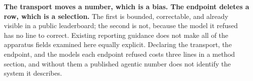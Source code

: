 \textbf{The transport moves a number, which is a bias. The endpoint deletes a row, which is a selection.}
The first is bounded, correctable, and already visible in a public leaderboard; the second is not, because
the model it refused has no line to correct. Existing reporting guidance does not make all of the apparatus
fields examined here equally explicit. Declaring the transport, the endpoint, and the models each endpoint
refused costs three lines in a method section, and without them a published agentic number does not
identify the system it describes.
